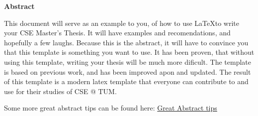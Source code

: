 
\clearemptydoublepage
{}
{}

\vspace*{2cm}
\begin{center}
{\Large \textbf{Abstract}}
\end{center}
\vspace{1cm}

This document will serve as an example to you, of how to use \LaTeX to write your
CSE Master's Thesis. It will have examples and recomendations, and hopefully a
few laughs.  Because this is the abstract, it will have to convince you that this
template is something you want to use.  It has been proven, that without using
this template, writing your thesis will be much more dificult. The template is
based on previous work, and has been improved apon and updated.  The result of
this template is a modern latex template that everyone can contribute to and use
for their studies of CSE @ TUM.

Some more great abstract tips can be found here:
\href{https://users.ece.cmu.edu/~koopman/essays/abstract.html}{Great Abstract tips}
